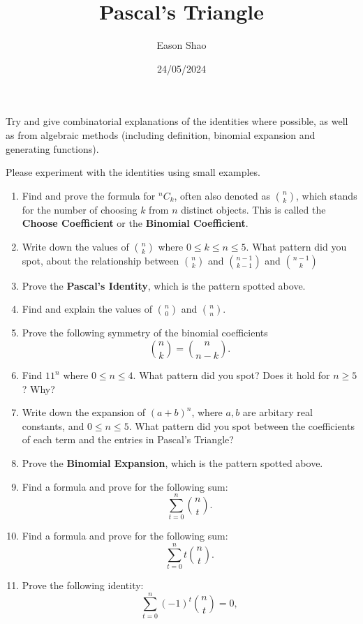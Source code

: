 \documentclass[12pt]{article}
\title{Pascal's Triangle}
\author{Eason Shao}
\date{24/05/2024}
\begin{document}
    \maketitle

    Try and give combinatorial explanations of the identities where possible, as well as from algebraic methods (including definition, binomial expansion and generating functions).\bigskip

    Please experiment with the identities using small examples.

    \begin{enumerate}
        \item Find and prove the formula for \(^nC_k\), often also denoted as \(\binom{n}{k}\), which stands for the number of choosing \(k\) from \(n\) distinct objects. This is called the \textbf{Choose Coefficient} or the \textbf{Binomial Coefficient}.
        \item Write down the values of \(\binom{n}{k}\) where \(0 \leq k \leq n \leq 5\). What pattern did you spot, about the relationship between \(\binom{n}{k}\) and \(\binom{n-1}{k-1}\) and \(\binom{n-1}{k}\)
        \item Prove the \textbf{Pascal's Identity}, which is the pattern spotted above.
        \item Find and explain the values of \(\binom{n}{0}\) and \(\binom{n}{n}\).
        \item Prove the following symmetry of the binomial coefficients
        \[
            \binom{n}{k} = \binom{n}{n-k}.
        \]
        \item Find \(11^n\) where \(0 \leq n \leq 4\). What pattern did you spot? Does it hold for \(n \geq 5\)? Why?
        \item Write down the expansion of \((a+b)^n\), where \(a, b\) are arbitary real constants, and \(0 \leq n \leq 5\). What pattern did you spot between the coefficients of each term and the entries in Pascal's Triangle?
        \item Prove the \textbf{Binomial Expansion}, which is the pattern spotted above.
        \item Find a formula and prove for the following sum:
        \[
            \sum_{t = 0}^{n} \binom{n}{t}.
        \]
        \item Find a formula and prove for the following sum:
        \[
            \sum_{t = 0}^{n} t \binom{n}{t}.
        \]
        \item Prove the following identity:
        \[
            \sum_{t = 0}^{n} (-1)^t \binom{n}{t} = 0,
\]
\end{enumerate}
\end{document}
